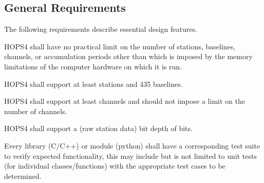 %
%




\subsection{General Requirements}
\label{sec:genreq}

The following requirements describe essential design features.

\begin{description}

 HOPS4 shall have no practical limit on the number of stations,
baselines, channels, or accumulation periods other than which is imposed by the
memory limitations of the computer hardware on which it is run.

 HOPS4 shall support at least \FIX[30] stations and 435 baselines.

 HOPS4 shall support at least \FIX[128] channels and should not impose a
 limit on the number of channels.

 HOPS4 shall support a (raw station data) bit depth of \FIX[2] bits.

 Every library (C/C++) or module (python) shall have a corresponding
test suite to verify expected functionality, this may include but is not limited
to unit tests (for individual classes/functions) with the appropriate test
cases to be determined.


\end{description}

